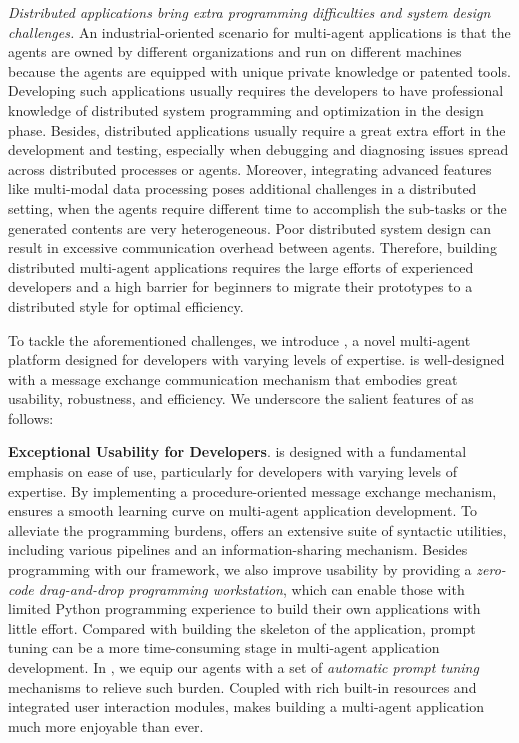 \textit{Distributed applications bring extra programming difficulties and system design challenges.}
An industrial-oriented scenario for multi-agent applications is that the agents are owned by different organizations and run on different machines because the agents are equipped with unique private knowledge or patented tools.
Developing such applications usually requires the developers to have professional knowledge of distributed system programming and optimization in the design phase.
Besides, distributed applications usually require a great extra effort in the development and testing, especially when debugging and diagnosing issues spread across distributed processes or agents.
Moreover, integrating advanced features like multi-modal data processing poses additional challenges in a distributed setting, when the agents require different time to accomplish the sub-tasks or the generated contents are very heterogeneous. 
Poor distributed system design can result in excessive communication overhead between agents. 
Therefore, building distributed multi-agent applications requires the large efforts of experienced developers and a high barrier for beginners to migrate their prototypes to a distributed style for optimal efficiency.

To tackle the aforementioned challenges, we introduce \textbf{\ours}, a novel multi-agent platform designed for developers with varying levels of expertise. 
\ours is well-designed with a message exchange communication mechanism that embodies great usability, robustness, and efficiency.
We underscore the salient features of \ours as follows:

\textbf{Exceptional Usability for Developers}.
\ours is designed with a fundamental emphasis on ease of use, particularly for developers with varying levels of expertise. 
By implementing a procedure-oriented message exchange mechanism, \ours ensures a smooth learning curve on multi-agent application development. 
To alleviate the programming burdens, \ours offers an extensive suite of syntactic utilities, including various pipelines and an information-sharing mechanism.
Besides programming with our framework, we also improve usability by providing a \emph{zero-code drag-and-drop programming workstation}, which can enable those with limited Python programming experience to build their own applications with little effort.
Compared with building the skeleton of the application, prompt tuning can be a more time-consuming stage in multi-agent application development.
In \ours, we equip our agents with a set of \emph{automatic prompt tuning} mechanisms to relieve such burden.
Coupled with rich built-in resources and integrated user interaction modules, \ours makes building a multi-agent application much more enjoyable than ever. 

